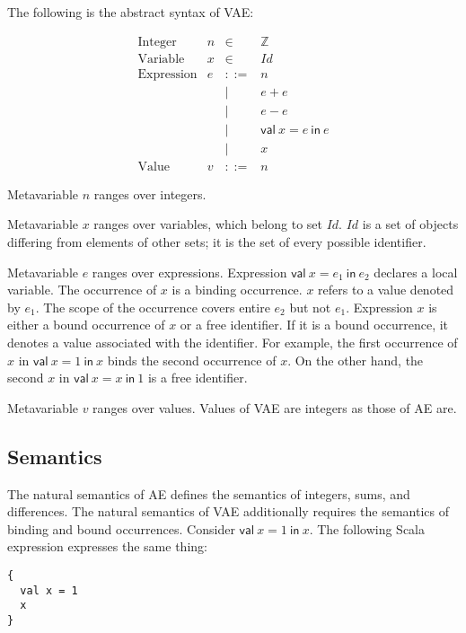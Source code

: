 The following is the abstract syntax of VAE:

\[
\begin{array}{lrcl}
\text{Integer} & n & \in & \mathbb{Z} \\
\text{Variable} & x & \in & \textit{Id} \\
\text{Expression} & e & ::= & n \\
&& | & e + e \\
&& | & e - e \\
&& | & \textsf{val}\ x = e\ \textsf{in}\ e \\
&& | & x \\
\text{Value} & v & ::= & n
\end{array}
\]

Metavariable \(n\) ranges over integers.

Metavariable \(x\) ranges over variables, which belong to set \(\mathit{Id}\).
\(\mathit{Id}\) is a set of objects differing from elements of other sets; it is
the set of every possible identifier.

Metavariable \(e\) ranges over expressions. Expression \(\textsf{val}\ x=e_1\
\textsf{in}\ e_2\) declares a local variable. The occurrence of \(x\) is a
binding occurrence. \(x\) refers to a value denoted by \(e_1\). The scope of the
occurrence covers entire \(e_2\) but not \(e_1\). Expression \(x\) is either a
bound occurrence of \(x\) or a free identifier. If it is a bound occurrence, it
denotes a value associated with the identifier. For example, the first occurrence
of \(x\) in \(\textsf{val}\ x=1\ \textsf{in}\ x\) binds the second occurrence of
\(x\). On the other hand, the second \(x\) in \(\textsf{val}\ x=x\ \textsf{in}\
1\) is a free identifier.

Metavariable \(v\) ranges over values. Values of VAE are integers as those of AE
are.

\subsection{Semantics}

The natural semantics of AE defines the semantics of integers, sums, and
differences. The natural semantics of VAE additionally requires the semantics of
binding and bound occurrences. Consider \(\textsf{val}\ x=1\ \textsf{in}\ x\).
The following Scala expression expresses the same thing:

\begin{verbatim}
{
  val x = 1
  x
}
\end{verbatim}

